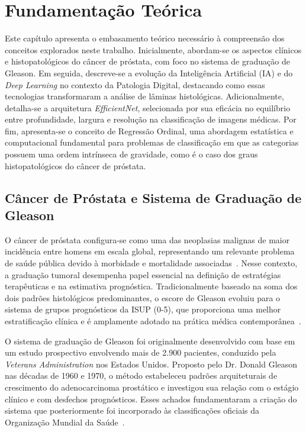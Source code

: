 \chapter{Fundamentação Teórica}
\label{cap:fundamentacao-teorica}

Este capítulo apresenta o embasamento teórico necessário à compreensão dos conceitos explorados neste trabalho. Inicialmente, abordam-se os aspectos clínicos e histopatológicos do câncer de próstata, com foco no sistema de graduação de Gleason. Em seguida, descreve-se a evolução da Inteligência Artificial (IA) e do \textit{Deep Learning} no contexto da Patologia Digital, destacando como essas tecnologias transformaram a análise de lâminas histológicas. Adicionalmente, detalha-se a arquitetura \textit{EfficientNet}, selecionada por sua eficácia no equilíbrio entre profundidade, largura e resolução na classificação de imagens médicas. Por fim, apresenta-se o conceito de Regressão Ordinal, uma abordagem estatística e computacional fundamental para problemas de classificação em que as categorias possuem uma ordem intrínseca de gravidade, como é o caso dos graus histopatológicos do câncer de próstata.

\section{Câncer de Próstata e Sistema de Graduação de Gleason}

O câncer de próstata configura-se como uma das neoplasias malignas de maior incidência entre homens em escala global, representando um relevante problema de saúde pública devido à morbidade e mortalidade associadas~\cite{ref-siegel2024}. Nesse contexto, a graduação tumoral desempenha papel essencial na definição de estratégias terapêuticas e na estimativa prognóstica. Tradicionalmente baseado na soma dos dois padrões histológicos predominantes, o escore de Gleason evoluiu para o sistema de grupos prognósticos da ISUP (0-5), que proporciona uma melhor estratificação clínica e é amplamente adotado na prática médica contemporânea~\cite{ref-epstein2016}.

O sistema de graduação de Gleason foi originalmente desenvolvido com base em um estudo prospectivo envolvendo mais de 2.900 pacientes, conduzido pela \textit{Veterans Administration} nos Estados Unidos. Proposto pelo Dr. Donald Gleason nas décadas de 1960 e 1970, o método estabeleceu padrões arquiteturais de crescimento do adenocarcinoma prostático e investigou sua relação com o estágio clínico e com desfechos prognósticos. Esses achados fundamentaram a criação do sistema que posteriormente foi incorporado às classificações oficiais da Organização Mundial da Saúde~\cite{chen2016}.

